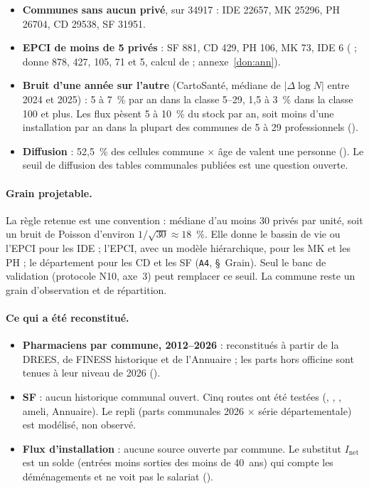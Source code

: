 \begin{itemize}
  \item \textbf{Communes sans aucun privé}, sur \num{34917}\mesure{} : IDE \num{22657}\mesure, MK
  \num{25296}\mesure, PH \num{26704}\mesure, CD \num{29538}\mesure, SF \num{31951}\mesure.
  \item \textbf{EPCI de moins de 5 privés} : SF 881\mesure, CD 429\mesure, PH 106\mesure, MK 73\mesure, IDE
  6\mesure{} ( ;  donne 878, 427, 105, 71 et 5\mesure, calcul de
   ; annexe~\ref{don:ann}).
  \item \textbf{Bruit d'une année sur l'autre} (CartoSanté, médiane de $|\Delta \log N|$ entre 2024 et 2025) :
  5 à 7~\%\mesure{} par an dans la classe 5--29, 1,5 à 3~\%\mesure{} dans la classe 100 et plus. Les flux pèsent
  5 à 10~\%\derive{} du stock par an, soit moins d'une installation par an dans la plupart des communes de 5 à
  29 professionnels\derive{} ().
  \item \textbf{Diffusion} : 52,5~\%\mesure{} des cellules commune $\times$ âge de
   valent une personne (). Le seuil de
  diffusion des tables communales publiées est une question ouverte.
\end{itemize}

\paragraph{Grain projetable.} La règle retenue est une convention : médiane d'au moins 30\suppose{} privés par
unité, soit un bruit de Poisson d'environ $1/\sqrt{30} \approx 18$~\%\derive. Elle donne le bassin de vie ou
l'EPCI pour les IDE ; l'EPCI, avec un modèle hiérarchique, pour les MK et les PH ; le département pour les CD et
les SF (\texttt{A4}, \S~Grain). Seul le banc de validation (protocole N10, axe~3) peut remplacer ce seuil. La
commune reste un grain d'observation et de répartition.

\paragraph{Ce qui a été reconstitué.}
\begin{itemize}
  \item \textbf{Pharmaciens par commune, 2012--2026} : reconstitués à partir de la DREES, de FINESS historique
  et de l'Annuaire ; les parts hors officine sont tenues à leur niveau de 2026\suppose{} ().
  \item \textbf{SF} : aucun historique communal ouvert. Cinq routes ont été testées (,
  , , ameli, Annuaire). Le repli (parts communales 2026
  $\times$ série départementale) est modélisé, non observé.
  \item \textbf{Flux d'installation} : aucune source ouverte par commune. Le substitut $I_{\mathrm{net}}$ est un
  solde (entrées moins sorties des moins de 40~ans) qui compte les déménagements et ne voit pas le salariat
  ().
\end{itemize}

